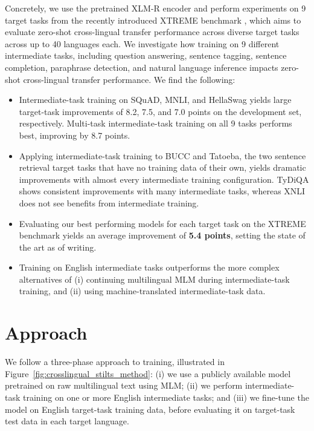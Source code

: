 \documentclass[11pt,a4paper]{article}
\begin{document}
Concretely, we use the pretrained XLM-R \citep{conneau2019xlmr} encoder and perform experiments on 9 target tasks from the recently introduced XTREME benchmark \cite{hu2020xtreme}, which aims to evaluate zero-shot cross-lingual transfer performance across diverse target tasks across up to 40 languages each.
We investigate how training on 9 different intermediate tasks, including question answering, sentence tagging, sentence completion, paraphrase detection, and natural language inference impacts zero-shot cross-lingual transfer performance.
We find the following:
\begin{itemize}
    \item Intermediate-task training on SQuAD, MNLI, and HellaSwag yields large target-task improvements of 8.2, 7.5, and 7.0 points on the development set, respectively.
    Multi-task intermediate-task training on all 9 tasks performs best, improving by 8.7 points. 
\item Applying intermediate-task training to BUCC and Tatoeba, the two sentence retrieval target tasks that have no training data of their own, yields dramatic improvements with almost every intermediate training configuration.
    TyDiQA shows consistent improvements with many intermediate tasks, whereas XNLI does not see benefits from intermediate training.
    \item Evaluating our best performing models for each target task on the XTREME benchmark yields an average improvement of {\bf 5.4 points}, setting the state of the art as of writing.
    \item Training on English intermediate tasks
outperforms the more complex alternatives of (i) continuing multilingual MLM during intermediate-task training, and (ii) using machine-translated intermediate-task data.
\end{itemize}



\section{Approach}

We follow a three-phase approach to training, illustrated in Figure~\ref{fig:crosslingual_stilts_method}: (i) we use a publicly available model pretrained on raw multilingual text using MLM; (ii) we perform intermediate-task training on one or more English intermediate tasks; and (iii) we fine-tune the model on English target-task training data, before evaluating it on target-task test data in each target language.
\end{document}
